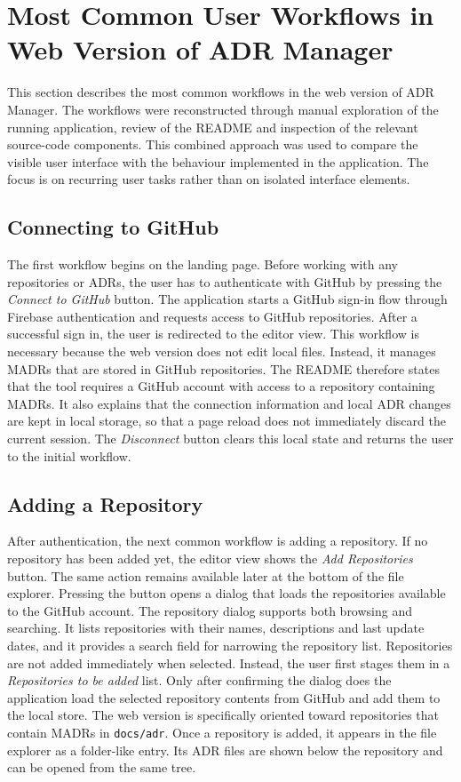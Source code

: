 \section{Most Common User Workflows in Web Version of ADR Manager}

This section describes the most common workflows in the web version of ADR Manager. The workflows were reconstructed through manual exploration of the running application, review of the README and inspection of the relevant source-code components. This combined approach was used to compare the visible user interface with the behaviour implemented in the application. The focus is on recurring user tasks rather than on isolated interface elements.

\subsection{Connecting to GitHub}

The first workflow begins on the landing page. Before working with any repositories or ADRs, the user has to authenticate with GitHub by pressing the \textit{Connect to GitHub} button. The application starts a GitHub sign-in flow through Firebase authentication and requests access to GitHub repositories. After a successful sign in, the user is redirected to the editor view. This workflow is necessary because the web version does not edit local files. Instead, it manages MADRs that are stored in GitHub repositories. The README therefore states that the tool requires a GitHub account with access to a repository containing MADRs. It also explains that the connection information and local ADR changes are kept in local storage, so that a page reload does not immediately discard the current session. The \textit{Disconnect} button clears this local state and returns the user to the initial workflow.

\subsection{Adding a Repository}

After authentication, the next common workflow is adding a repository. If no repository has been added yet, the editor view shows the \textit{Add Repositories} button. The same action remains available later at the bottom of the file explorer. Pressing the button opens a dialog that loads the repositories available to the GitHub account. The repository dialog supports both browsing and searching. It lists repositories with their names, descriptions and last update dates, and it provides a search field for narrowing the repository list. Repositories are not added immediately when selected. Instead, the user first stages them in a \textit{Repositories to be added} list. Only after confirming the dialog does the application load the selected repository contents from GitHub and add them to the local store. The web version is specifically oriented toward repositories that contain MADRs in \texttt{docs/adr}. Once a repository is added, it appears in the file explorer as a folder-like entry. Its ADR files are shown below the repository and can be opened from the same tree.

